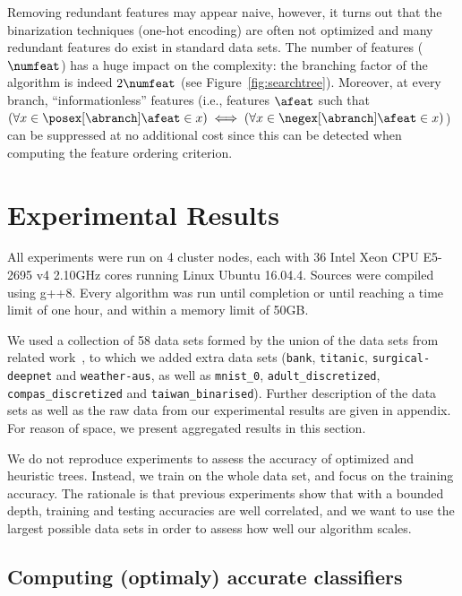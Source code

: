 \documentclass{article}
\begin{document}
Removing redundant features may appear naive, however, it turns out that the binarization techniques (one-hot encoding) are often not optimized and many redundant features do exist in standard data sets. The number of features ($\numfeat$) has a huge impact on the complexity:
 the branching factor of the algorithm is indeed
 $2\numfeat$ (see Figure~\ref{fig:searchtree}).
%
Moreover, at every branch, ``informationless'' features (i.e., features $\afeat$ such that $(\forall x \in \posex[\abranch] \afeat \in x) \iff (\forall x \in \negex[\abranch] \afeat \in x)$) can be suppressed at no additional cost since this can be detected when computing the feature ordering criterion.




\section{Experimental Results}
\label{sec:exp}

All experiments were run
on 4 cluster nodes, each with 36 Intel Xeon CPU E5-2695 v4 2.10GHz cores
running Linux Ubuntu 16.04.4. Sources were compiled using g++8. 
Every algorithm was run until completion or until reaching a time limit of one hour, and within a memory limit of 50GB.

We used a collection of 58 data sets formed by the union of the data sets from related work~\cite{narodytska2018learning,dl85,verwer2019learning}, to which we added extra data sets (\texttt{bank}, \texttt{titanic}, \texttt{surgical-deepnet} and \texttt{weather-aus}, as well as \texttt{mnist\_0}, \texttt{adult\_discretized}, \texttt{compas\_discretized} and \texttt{taiwan\_binarised}). Further description of the data sets as well as the raw data from our experimental results are given in appendix. For reason of space, we present aggregated results in this section.

We do not reproduce experiments to assess the accuracy of optimized and heuristic trees. Instead, we train on the whole data set, and focus on the training accuracy. The rationale is that previous experiments show that with a bounded depth, training and testing accuracies are well correlated, and we want to use the largest possible data sets in order to assess how well our algorithm scales.




\subsection{Computing (optimaly) accurate classifiers}
\end{document}
